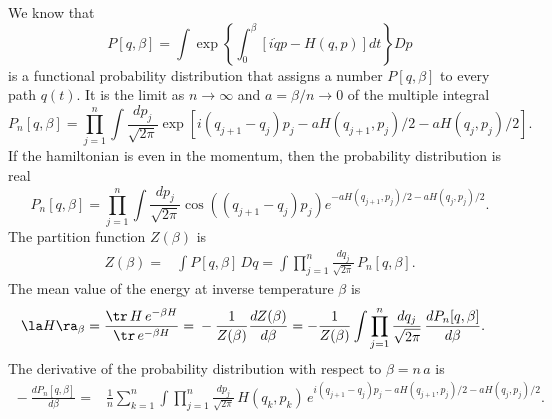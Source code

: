 \documentclass[prd,preprint,floatfix,showpacs]{revtex4-1}
\begin{document}
We know that 
\begin{equation}   
P[q,\beta] = {} \int \exp
\left\{ \int_0^\beta \left[ i \dot q p - H(q,p) \right] dt \right\}
Dp
\label {We know that }
\end{equation}
is a functional probability distribution
that assigns a number \( P[q, \beta] \)
to every path \( q(t) \)\@.
It is the limit as \( n \to \infty \) and \(  a =\beta/n \to 0 \)
of the multiple integral
\begin{equation}   
P_n[q,\beta] ={} \prod_{j=1}^n \int\frac{dp_j }{\sqrt{2\pi}} 
 \exp \left[  i (q_{j+1} - q_j) p_j 
 - a H(q_{j+1},p_j)/2 - a H(q_j,p_j)/2 \right] .
 \label {In the limit }
\end{equation}
If the hamiltonian is even in the momentum,
then the probability distribution is real
\begin{equation}   
P_n[q,\beta] ={} \prod_{j=1}^n \int\frac{dp_j }{\sqrt{2\pi}} 
 \cos((q_{j+1} - q_j) p_j) 
 e^{-a H(q_{j+1},p_j)/2 -a H(q_j,p_j)/2} .
 \label {P when H is p even}
\end{equation}
The partition function \( Z(\beta) \) is
\begin{equation}
   \begin{split}
      Z(\beta) = {}&  \int P[q, \beta] \, Dq
     = {} \int \prod_{j=1}^n \frac{dq_j}{\sqrt{2\pi}} \,
      P_n[q,\beta] .
  \label {I hope The partition function is}   
   \end{split}
\end{equation}
The mean value of the energy 
at inverse temperature \( \beta \) is
\begin{equation}
   \begin{split}
\la H \ra_\beta ={}
\frac{\tr \, H \, e^{- \beta H}} {\tr \, e^{- \beta H}}  
={}& - \frac{1}{Z(\beta)} \frac{d Z(\beta)}{d \beta}
= - \frac{1}{Z(\beta)} \int \prod_{j=1}^n \frac{dq_j}{\sqrt{2\pi}} \,
\frac{d P_n[q,\beta] }{d \beta} .
\label {mean value of the energy at beta}
   \end{split}
\end{equation}
The derivative of the probability distribution 
with respect to \( \beta = n \, a \) is
\begin{equation}
 \begin{split}
{} - \frac{d  P_n[q,\beta] }{d \beta}
={}& \frac{1}{n} \sum_{k=1}^n 
\int \prod_{j=1}^n \frac{dp_j }{\sqrt{2\pi}} \, H(q_k,p_k) 
\, e^{ i (q_{j+1} - q_j) p_j - a H(q_{j+1},p_j)/2
 - a H(q_j,p_j)/2 } .
   \end{split}
\end{equation}
\end{document}
